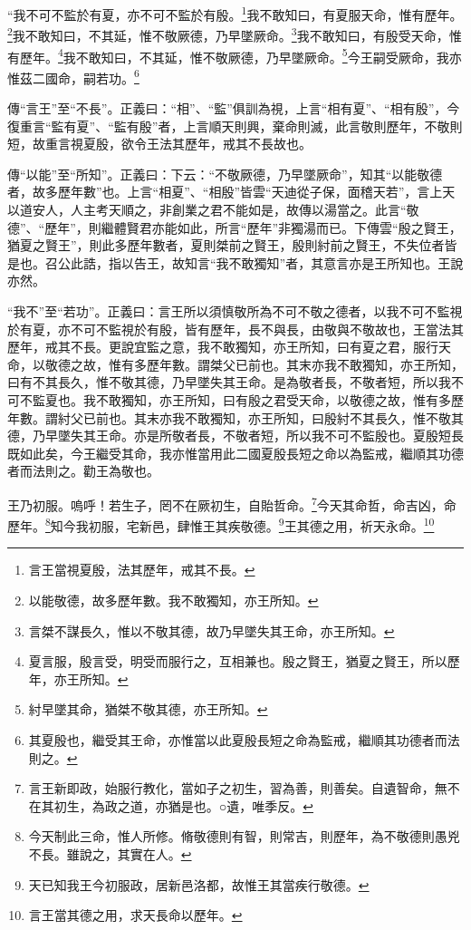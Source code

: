 “我不可不監於有夏，亦不可不監於有殷。\footnote{言王當視夏殷，法其歷年，戒其不長。}我不敢知曰，有夏服天命，惟有歷年。\footnote{以能敬德，故多歷年數。我不敢獨知，亦王所知。}我不敢知曰，不其延，惟不敬厥德，乃早墜厥命。\footnote{言桀不謀長久，惟以不敬其德，故乃早墜失其王命，亦王所知。}我不敢知曰，有殷受天命，惟有歷年。\footnote{夏言服，殷言受，明受而服行之，互相兼也。殷之賢王，猶夏之賢王，所以歷年，亦王所知。}我不敢知曰，不其延，惟不敬厥德，乃早墜厥命。\footnote{紂早墜其命，猶桀不敬其德，亦王所知。}今王嗣受厥命，我亦惟茲二國命，嗣若功。\footnote{其夏殷也，繼受其王命，亦惟當以此夏殷長短之命為監戒，繼順其功德者而法則之。}


{\noindent\zhuan{}\fzbyks 傳“言王”至“不長”。正義曰：“相”、“監”俱訓為視，上言“相有夏”、“相有殷”，今復重言“監有夏”、“監有殷”者，上言順天則興，棄命則滅，此言敬則歷年，不敬則短，故重言視夏殷，欲令王法其歷年，戒其不長故也。 \par}

{\noindent\zhuan{}\fzbyks 傳“以能”至“所知”。正義曰：下云：“不敬厥德，乃早墜厥命”，知其“以能敬德者，故多歷年數”也。上言“相夏”、“相殷”皆雲“天迪從子保，面稽天若”，言上天以道安人，人主考天順之，非創業之君不能如是，故傳以湯當之。此言“敬德”、“歷年”，則繼體賢君亦能如此，所言“歷年”非獨湯而已。下傳雲“殷之賢王，猶夏之賢王”，則此多歷年數者，夏則桀前之賢王，殷則紂前之賢王，不失位者皆是也。召公此誥，指以告王，故知言“我不敢獨知”者，其意言亦是王所知也。王說亦然。 \par}

{\noindent\shu{}\fzkt “我不”至“若功”。正義曰：言王所以須慎敬所為不可不敬之德者，以我不可不監視於有夏，亦不可不監視於有殷，皆有歷年，長不與長，由敬與不敬故也，王當法其歷年，戒其不長。更說宜監之意，我不敢獨知，亦王所知，曰有夏之君，服行天命，以敬德之故，惟有多歷年數。謂桀父已前也。其末亦我不敢獨知，亦王所知，曰有不其長久，惟不敬其德，乃早墜失其王命。是為敬者長，不敬者短，所以我不可不監夏也。我不敢獨知，亦王所知，曰有殷之君受天命，以敬德之故，惟有多歷年數。謂紂父已前也。其末亦我不敢獨知，亦王所知，曰殷紂不其長久，惟不敬其德，乃早墜失其王命。亦是所敬者長，不敬者短，所以我不可不監殷也。夏殷短長既如此矣，今王繼受其命，我亦惟當用此二國夏殷長短之命以為監戒，繼順其功德者而法則之。勸王為敬也。 \par}

王乃初服。嗚呼！若生子，罔不在厥初生，自貽哲命。\footnote{言王新即政，始服行教化，當如子之初生，習為善，則善矣。自遺智命，無不在其初生，為政之道，亦猶是也。○遺，唯季反。}今天其命哲，命吉凶，命歷年。\footnote{今天制此三命，惟人所修。脩敬德則有智，則常吉，則歷年，為不敬德則愚兇不長。雖說之，其實在人。}知今我初服，宅新邑，肆惟王其疾敬德。\footnote{天已知我王今初服政，居新邑洛都，故惟王其當疾行敬德。}王其德之用，祈天永命。\footnote{言王當其德之用，求天長命以歷年。}


